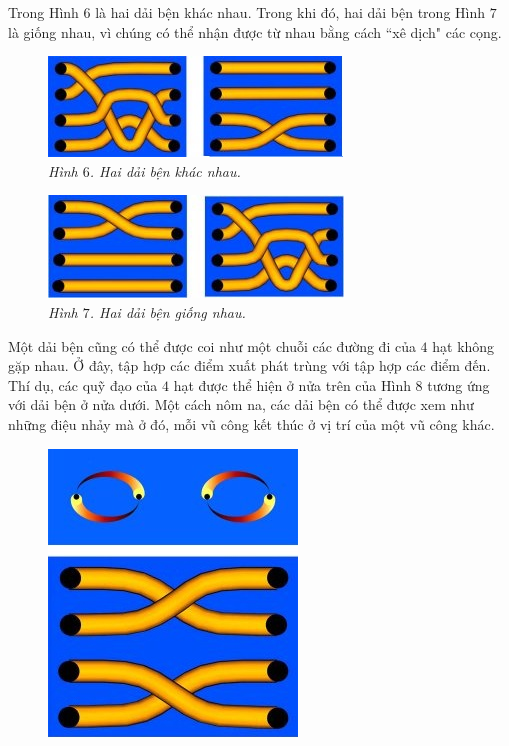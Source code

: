 \begin{multicols}{2}
	Trong Hình $6$ là hai dải bện khác nhau. Trong khi đó, hai dải bện trong Hình $7$ là giống nhau, vì chúng có thể nhận được từ nhau bằng cách ``xê dịch" các cọng.
	\begin{figure}[H]
		\vspace*{-5pt}
		\centering
		\captionsetup{labelformat= empty, justification=centering}
		\includegraphics[width= 1\linewidth]{fig_06}
		\caption{\small\textit{\color{duongvaotoanhoc}Hình $6$. Hai dải bện khác nhau.}}
		\vspace*{-5pt}
	\end{figure}
	\begin{figure}[H]
		\vspace*{2pt}
		\centering
		\captionsetup{labelformat= empty, justification=centering}
		\includegraphics[width= 0.97\linewidth]{fig_07}
		\caption{\small\textit{\color{duongvaotoanhoc}Hình $7$. Hai dải bện giống nhau.}}
		\vspace*{-10pt}
	\end{figure}
	Một dải bện cũng có thể được coi như một chuỗi các đường đi của $4$ hạt không gặp nhau. Ở đây, tập hợp các điểm xuất phát trùng với tập hợp các điểm đến. Thí dụ, các quỹ đạo của $4$ hạt được thể hiện ở nửa trên của Hình $8$ tương ứng với dải bện ở nửa dưới. Một cách nôm na, các dải bện có thể được xem như những điệu nhảy mà ở đó, mỗi vũ công kết thúc ở vị trí của một vũ công khác.
	\begin{figure}[H]
		\vspace*{-5pt}
		\centering
		\captionsetup{labelformat= empty, justification=centering}
		\includegraphics[width= 0.475\linewidth]{fig_08}

\end{figure}
\end{multicols}
